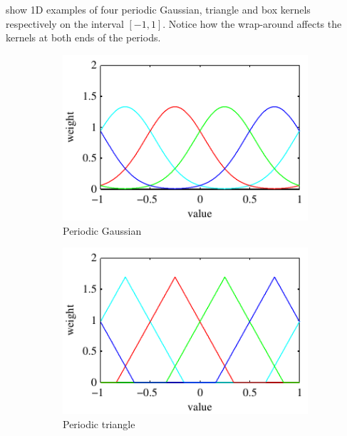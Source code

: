 \documentclass[thesis.tex]{subfiles}
\begin{document}
  show 1D examples of four periodic Gaussian, triangle and box kernels respectively on the interval $[-1,1]$. Notice how the wrap-around affects the kernels at both ends of the periods.
%
\begin{figure}[tb]
	\centering
	\begin{subfigure}[t]{0.32\textwidth}
		\includegraphics[width=\textwidth]{img/binFilterGaussianPeriodic.pdf}
		\caption{Periodic Gaussian}
		\label{fig:1dFilterGaussianPeriodic}
	\end{subfigure}
	\begin{subfigure}[t]{0.32\textwidth}
		\includegraphics[width=\textwidth]{img/binFilterTrianglePeriodic.pdf}
		\caption{Periodic triangle}
		\label{fig:1dFilterTrianglePeriodic}
	\end{subfigure}
	\begin{subfigure}[t]{0.32\textwidth}

\end{subfigure}
\end{figure}
\end{document}
